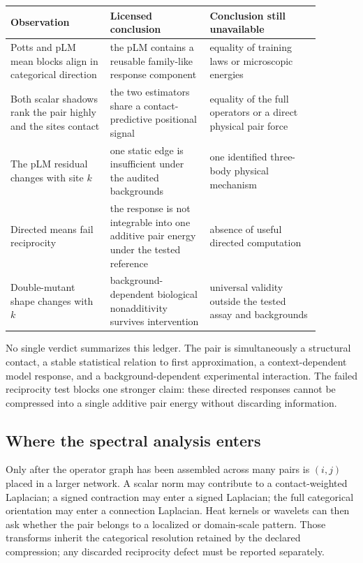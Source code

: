 \begin{center}
\small
\begin{tabular}{@{}>{\raggedright\arraybackslash}p{0.28\linewidth}
                >{\raggedright\arraybackslash}p{0.29\linewidth}
                >{\raggedright\arraybackslash}p{0.31\linewidth}@{}}
\toprule
Observation & Licensed conclusion & Conclusion still unavailable \\
\midrule
Potts and pLM mean blocks align in categorical direction & the pLM contains a reusable family-like response component & equality of training laws or microscopic energies \\
Both scalar shadows rank the pair highly and the sites contact & the two estimators share a contact-predictive positional signal & equality of the full operators or a direct physical pair force \\
The pLM residual changes with site $k$ & one static edge is insufficient under the audited backgrounds & one identified three-body physical mechanism \\
Directed means fail reciprocity & the response is not integrable into one additive pair energy under the tested reference & absence of useful directed computation \\
Double-mutant shape changes with $k$ & background-dependent biological nonadditivity survives intervention & universal validity outside the tested assay and backgrounds \\
\bottomrule
\end{tabular}
\end{center}

No single verdict summarizes this ledger.  The pair is simultaneously a structural contact, a
stable statistical relation to first approximation, a context-dependent model response, and a
background-dependent experimental interaction.  The failed reciprocity test blocks one stronger
claim: these directed responses cannot be compressed into a single additive pair energy without
discarding information.

\subsection{Where the spectral analysis enters}

Only after the operator graph has been assembled across many pairs is $(i,j)$ placed in a larger
network.  A scalar norm may contribute to a contact-weighted Laplacian; a signed contraction may
enter a signed Laplacian; the full categorical orientation may enter a connection Laplacian.
Heat kernels or wavelets can then ask whether the pair belongs to a localized or domain-scale
pattern.  Those transforms inherit the categorical resolution retained by the declared
compression; any discarded reciprocity defect must be reported separately.

